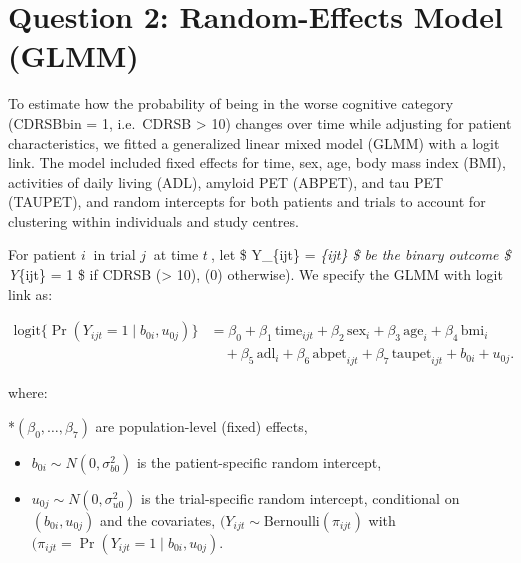 \documentclass[
  11pt,
  letterpaper,
  DIV=11,
  numbers=noendperiod]{scrartcl}
\begin{document}
\section{Question 2: Random-Effects Model
(GLMM)}\label{question-2-random-effects-model-glmm}

To estimate how the probability of being in the worse cognitive category
(CDRSBbin = 1, i.e.~CDRSB \textgreater{} 10) changes over time while
adjusting for patient characteristics, we fitted a generalized linear
mixed model (GLMM) with a logit link. The model included fixed effects
for time, sex, age, body mass index (BMI), activities of daily living
(ADL), amyloid PET (ABPET), and tau PET (TAUPET), and random intercepts
for both patients and trials to account for clustering within
individuals and study centres.

For patient \(i\ \) in trial \(j\ \) at time \(t\ \), let \$ Y\_\{ijt\}
= \emph{\{ijt\} \$ be the binary outcome \$ Y}\{ijt\} = 1
\$ if CDRSB (\textgreater{} 10), (0) otherwise). We specify the GLMM
with logit link as:

\[
\begin{aligned}
\text{logit}\bigl\{\Pr(Y_{ijt} = 1 \mid b_{0i}, u_{0j})\bigr\}
&= \beta_0
+ \beta_1\,\text{time}_{ijt}
+ \beta_2\,\text{sex}_i
+ \beta_3\,\text{age}_i
+ \beta_4\,\text{bmi}_i \\
&\quad + \beta_5\,\text{adl}_i
+ \beta_6\,\text{abpet}_{ijt}
+ \beta_7\,\text{taupet}_{ijt}
+ b_{0i}
+ u_{0j}.
\end{aligned}
\]

where:

*\((\beta_0,\ldots, \beta_7)\) are population-level (fixed) effects,

\begin{itemize}
\item
  \(b_{0i} \sim N(0, \sigma_{b0}^2)\) is the patient-specific random
  intercept,
\item
  \(u_{0j} \sim N(0, \sigma_{u0}^2)\) is the trial-specific random
  intercept, conditional on \((b_{0i}, u_{0j})\) and the covariates,
  \((Y_{ijt} \sim \text{Bernoulli}(\pi_{ijt})\) with
  \((\pi_{ijt} = \Pr(Y_{ijt}=1 \mid b_{0i}, u_{0j})\).
\end{itemize}
\end{document}
